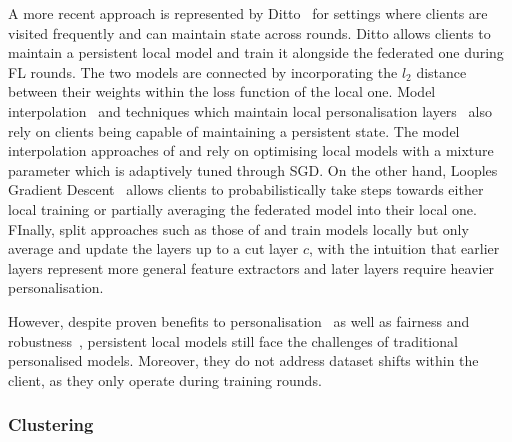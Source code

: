 A more recent approach is represented by Ditto~\citep{Ditto} for settings where clients are visited frequently and can maintain state across rounds. Ditto allows clients to maintain a persistent local model and train it alongside the federated one during FL rounds. The two models are connected by incorporating the $l_2$ distance between their weights within the loss function of the local one.  Model interpolation~\citep{ThreeApproachesMansour,AdaptivePersonalisedFederatedLearning,FederatedLearningMixtureOfGlobalAndLocal} and techniques which maintain local personalisation layers~\citep{FlWithPersonalisationLayers,FedSplitBert} also rely on clients being capable of maintaining a persistent state. The model interpolation approaches of \citet{ThreeApproachesMansour} and \citet{AdaptivePersonalisedFederatedLearning} rely on optimising local models with a mixture parameter which is adaptively tuned through SGD. On the other hand, Looples Gradient Descent~\citep{FederatedLearningMixtureOfGlobalAndLocal} allows clients to probabilistically take steps towards either local training or partially averaging the federated model into their local one. FInally, split approaches such as those of \citet{FlWithPersonalisationLayers} and \citet{FedSplitBert} train models locally but only average and update the layers up to a cut layer $c$, with the intuition that earlier layers represent more general feature extractors and later layers require heavier personalisation.

However, despite proven benefits to personalisation~\citep{FlWithPersonalisationLayers,AdaptivePersonalisedFederatedLearning} as well as fairness and robustness~\citep{Ditto}, persistent local models still face the challenges of traditional personalised models. Moreover, they do not address dataset shifts within the client, as they only operate during training rounds.

\subsubsection{Clustering}

